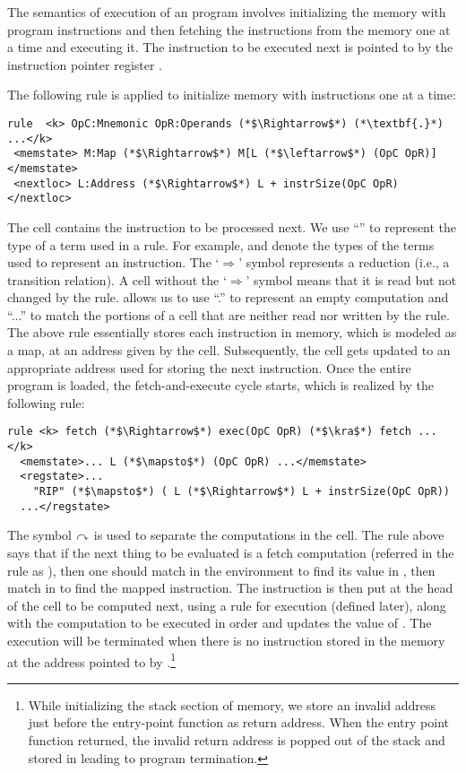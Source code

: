 The semantics of execution of an \ISA program involves initializing the memory with program instructions and then  fetching the instructions from the memory one at a time and executing it. The instruction to be executed next is pointed to by the instruction pointer register .  

The following rule is applied to initialize memory with instructions one at a time: 
\begin{lstlisting}[style=KRULE]
rule  <k> OpC:Mnemonic OpR:Operands (*$\Rightarrow$*) (*\textbf{.}*) ...</k>
 <memstate> M:Map (*$\Rightarrow$*) M[L (*$\leftarrow$*) (OpC OpR)] </memstate>
 <nextloc> L:Address (*$\Rightarrow$*) L + instrSize(OpC OpR) </nextloc>
\end{lstlisting}
The  cell contains the instruction to be processed next. We use ``'' to represent the type of a term used in a rule. For example,  and  denote the types of the terms used to represent an instruction.  The `$\Rightarrow$' symbol
represents a reduction (i.e., a transition relation). A cell without the `$\Rightarrow$' symbol means that it is read but not changed by the rule. \K allows us to use ``.'' to represent an empty computation and ``...'' to match the portions of a cell that are neither read nor written by the rule. The above rule essentially  stores each instruction in memory, which is modeled as a map, at an address  given by the  cell. Subsequently, the  cell gets updated to an appropriate address  used for storing the next instruction.  Once the entire program is loaded, the fetch-and-execute cycle starts, which is realized by the following rule:
\begin{lstlisting}[style=KRULE]
rule <k> fetch (*$\Rightarrow$*) exec(OpC OpR) (*$\kra$*) fetch ... </k>
  <memstate>... L (*$\mapsto$*) (OpC OpR) ...</memstate>
  <regstate>... 
    "RIP" (*$\mapsto$*) ( L (*$\Rightarrow$*) L + instrSize(OpC OpR))  
  ...</regstate>
\end{lstlisting}
%
 The symbol $\curvearrowright$ is used to separate the computations in the  cell.
 The rule above says that if the next thing to be evaluated is a fetch computation (referred in the rule as ), then one should match  in the environment to find its value 
 in , then match  in  to find the mapped instruction.
 The instruction is then put at the head of the  cell to be computed next, using a rule  for execution (defined later), along with the  computation to be executed in order and updates the value of . The execution will be terminated when there is no instruction stored in the memory at the address pointed to by .\footnote{While initializing the stack section of memory, we store an invalid address just before the entry-point function as return address. When the entry point function returned, the invalid return address is popped out of the stack and stored in  leading to program termination.} 

